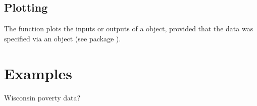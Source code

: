 \subsection{Plotting}
The function  plots the inputs or outputs of a  object, provided that the data was specified via an  object (see package ).

\section{Examples}
Wisconsin poverty data?




\address{Wesley Brooks\\
  Department of Statistics, University of Wisconsin-Madison\\
  1300 University Ave. Madison, WI 53706\\
  USA}
